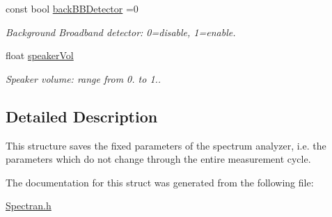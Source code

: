 \begin{DoxyCompactItemize}
\mbox{\label{structSpectranConfigurator_1_1FixedParameters_ad20c44e63927366260399b4ffa5a32d9}} 
const bool \hyperlink{structSpectranConfigurator_1_1FixedParameters_ad20c44e63927366260399b4ffa5a32d9}{back\+B\+B\+Detector} =0
\begin{DoxyCompactList}\small\item\em Background Broadband detector\+: 0=disable, 1=enable. \end{DoxyCompactList}\item 
\mbox{\label{structSpectranConfigurator_1_1FixedParameters_a4b30a0ba5199d6c6703838142da3bcdc}} 
float \hyperlink{structSpectranConfigurator_1_1FixedParameters_a4b30a0ba5199d6c6703838142da3bcdc}{speaker\+Vol}
\begin{DoxyCompactList}\small\item\em Speaker volume\+: range from 0. to 1.. \end{DoxyCompactList}\end{DoxyCompactItemize}


\subsection{Detailed Description}
This structure saves the fixed parameters of the spectrum analyzer, i.\+e. the parameters which do not change through the entire measurement cycle. 

The documentation for this struct was generated from the following file\+:\begin{DoxyCompactItemize}
\item 
\hyperlink{Spectran_8h}{Spectran.\+h}\end{DoxyCompactItemize}

